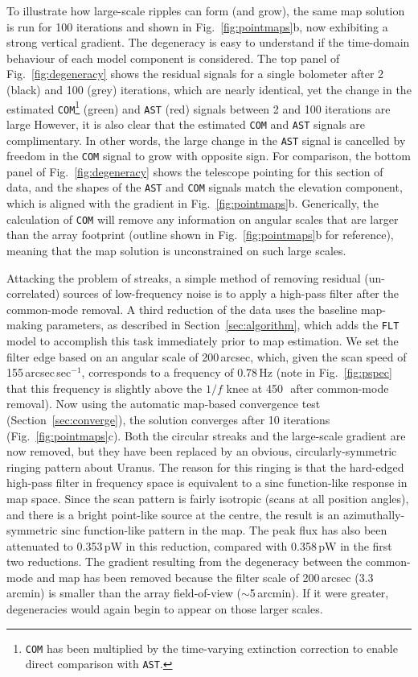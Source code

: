 \documentclass[useAMS,usenatbib,nofootinbib]{mn2e}
\def\sinc{\mathrm{sinc}}
\newcommand{\model}[1]{\texttt{#1}}
\begin{document}
To illustrate how large-scale ripples can form (and grow), the same
map solution is run for 100 iterations and shown in
Fig.~\ref{fig:pointmaps}b, now exhibiting a strong vertical
gradient. The degeneracy is easy to understand if the time-domain
behaviour of each model component is considered. The top panel of
Fig.~\ref{fig:degeneracy} shows the residual signals for a single
bolometer after 2 (black) and 100 (grey) iterations, which are nearly
identical, yet the change in the estimated
\model{COM}\footnote{\model{COM} has been multiplied by the
time-varying extinction correction to enable direct comparison with
\model{AST}.} (green) and \model{AST} (red) signals between 2 and 100
iterations are large However, it is also clear that the estimated
\model{COM} and \model{AST} signals are complimentary. In other words,
the large change in the \model{AST} signal is cancelled by freedom in
the \model{COM} signal to grow with opposite sign. For comparison, the
bottom panel of Fig.~\ref{fig:degeneracy} shows the telescope pointing
for this section of data, and the shapes of the \model{AST} and
\model{COM} signals match the elevation component, which is aligned
with the gradient in Fig.~\ref{fig:pointmaps}b. Generically, the
calculation of \model{COM} will remove any information on angular
scales that are larger than the array footprint (outline shown in
Fig.~\ref{fig:pointmaps}b for reference), meaning that the map
solution is unconstrained on such large scales.

Attacking the problem of streaks, a simple method of removing residual
(un-correlated) sources of low-frequency noise is to apply a high-pass
filter after the common-mode removal. A third reduction of the data
uses the baseline map-making parameters, as described in
Section~\ref{sec:algorithm}, which adds the \model{FLT} model to
accomplish this task immediately prior to map estimation. We set the
filter edge based on an angular scale of 200\,arcsec, which, given the
scan speed of 155\,arcsec\,sec$^{-1}$, corresponds to a frequency of
0.78\,Hz (note in Fig.~\ref{fig:pspec} that this frequency is slightly
above the $1/f$ knee at 450\,\micron\ after common-mode removal). Now
using the automatic map-based convergence test
(Section~\ref{sec:converge}), the solution converges after 10
iterations (Fig.~\ref{fig:pointmaps}c). Both the circular streaks and
the large-scale gradient are now removed, but they have been replaced
by an obvious, circularly-symmetric ringing pattern about Uranus. The
reason for this ringing is that the hard-edged high-pass filter in
frequency space is equivalent to a $\sinc$ function-like response in
map space. Since the scan pattern is fairly isotropic (scans at all
position angles), and there is a bright point-like source at the
centre, the result is an azimuthally-symmetric $\sinc$ function-like
pattern in the map. The peak flux has also been attenuated to
0.353\,pW in this reduction, compared with 0.358\,pW in the first two
reductions. The gradient resulting from the degeneracy between the
common-mode and map has been removed because the filter scale of
200\,arcsec (3.3\,arcmin) is smaller than the array field-of-view
($\sim$5\,arcmin). If it were greater, degeneracies would again begin
to appear on those larger scales.
\end{document}
